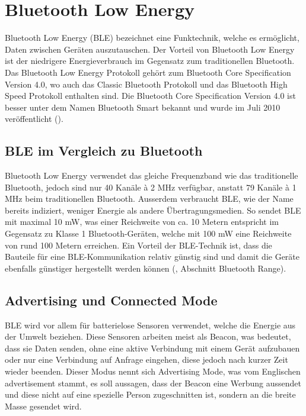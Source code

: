\section{Bluetooth Low Energy}\label{t_ble} 

Bluetooth Low Energy (BLE) bezeichnet eine Funktechnik, welche es ermöglicht, Daten zwischen Geräten auszutauschen. Der Vorteil von Bluetooth Low Energy ist der niedrigere Energieverbrauch im Gegensatz zum traditionellen Bluetooth. Das Bluetooth Low Energy Protokoll gehört zum Bluetooth Core Specification Version 4.0, wo auch das Classic Bluetooth Protokoll und das Bluetooth High Speed Protokoll enthalten sind. Die Bluetooth Core Specification Version 4.0 ist besser unter dem Namen Bluetooth Smart bekannt und wurde im Juli 2010 veröffentlicht (\cite{youtube_BLE}).

\subsection{BLE im Vergleich zu Bluetooth}
  
Bluetooth Low Energy verwendet das gleiche Frequenzband wie das traditionelle Bluetooth, jedoch sind nur 40 Kanäle \`{a} 2 MHz verfügbar, anstatt 79 Kanäle \`{a} 1 MHz beim traditionellen Bluetooth. Ausserdem verbraucht BLE, wie der Name bereits indiziert, weniger Energie als andere Übertragungsmedien. So sendet BLE mit maximal 10 mW, was einer Reichweite von ca. 10 Metern entspricht im Gegensatz zu Klasse 1 Bluetooth-Geräten, welche mit 100 mW eine Reichweite von rund 100 Metern erreichen. Ein Vorteil der BLE-Technik ist, dass die Bauteile für eine BLE-Kommunikation relativ günstig sind und damit die Geräte ebenfalls günstiger hergestellt werden können (\cite{Interent_BLE}, Abschnitt Bluetooth Range).

\subsection{Advertising und Connected Mode}

BLE wird vor allem für batterielose Sensoren verwendet, welche die Energie aus der Umwelt beziehen. Diese Sensoren arbeiten meist als Beacon, was bedeutet, dass sie Daten senden, ohne eine aktive Verbindung mit einem Gerät aufzubauen oder nur eine Verbindung auf Anfrage eingehen, diese jedoch nach kurzer Zeit wieder beenden. Dieser Modus nennt sich Advertising Mode, was vom Englischen advertisement stammt, es soll aussagen, dass der Beacon eine Werbung aussendet und diese nicht auf eine spezielle Person zugeschnitten ist, sondern an die breite Masse gesendet wird.

